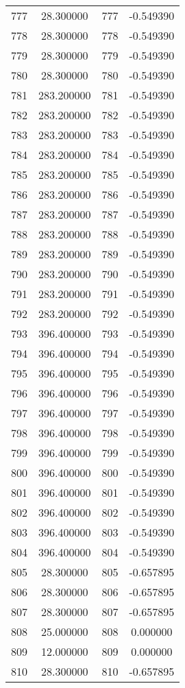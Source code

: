 \documentclass[12pt]{article}
\begin{document}
\begin{longtable}{@{}cccc@{}}
777 & 28.300000 & 777 & -0.549390 \\
778 & 28.300000 & 778 & -0.549390 \\
779 & 28.300000 & 779 & -0.549390 \\
780 & 28.300000 & 780 & -0.549390 \\
781 & 283.200000 & 781 & -0.549390 \\
782 & 283.200000 & 782 & -0.549390 \\
783 & 283.200000 & 783 & -0.549390 \\
784 & 283.200000 & 784 & -0.549390 \\
785 & 283.200000 & 785 & -0.549390 \\
786 & 283.200000 & 786 & -0.549390 \\
787 & 283.200000 & 787 & -0.549390 \\
788 & 283.200000 & 788 & -0.549390 \\
789 & 283.200000 & 789 & -0.549390 \\
790 & 283.200000 & 790 & -0.549390 \\
791 & 283.200000 & 791 & -0.549390 \\
792 & 283.200000 & 792 & -0.549390 \\
793 & 396.400000 & 793 & -0.549390 \\
794 & 396.400000 & 794 & -0.549390 \\
795 & 396.400000 & 795 & -0.549390 \\
796 & 396.400000 & 796 & -0.549390 \\
797 & 396.400000 & 797 & -0.549390 \\
798 & 396.400000 & 798 & -0.549390 \\
799 & 396.400000 & 799 & -0.549390 \\
800 & 396.400000 & 800 & -0.549390 \\
801 & 396.400000 & 801 & -0.549390 \\
802 & 396.400000 & 802 & -0.549390 \\
803 & 396.400000 & 803 & -0.549390 \\
804 & 396.400000 & 804 & -0.549390 \\
805 & 28.300000 & 805 & -0.657895 \\
806 & 28.300000 & 806 & -0.657895 \\
807 & 28.300000 & 807 & -0.657895 \\
808 & 25.000000 & 808 & 0.000000 \\
809 & 12.000000 & 809 & 0.000000 \\
810 & 28.300000 & 810 & -0.657895 \\

\end{longtable}
\end{document}
